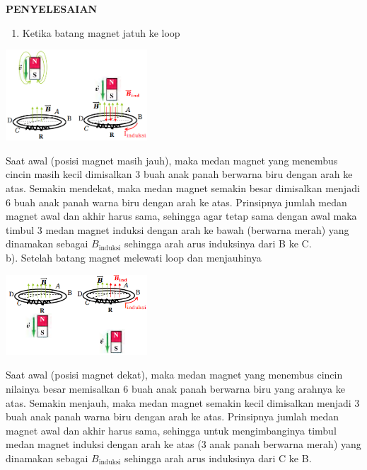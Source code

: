 \documentclass[twocolumn, 11pt]{article}%
\begin{document}
\textbf{PENYELESAIAN} 

\begin{enumerate}[label=\alph*).]
    \item Ketika batang magnet jatuh ke loop
\end{enumerate}

\begin{center}
    \includegraphics[width=200px]{11.png}
\end{center}

Saat awal (posisi magnet masih jauh), maka medan magnet yang menembus
cincin masih kecil dimisalkan 3 buah anak panah berwarna biru dengan arah
ke atas. Semakin mendekat, maka medan magnet semakin besar dimisalkan
menjadi 6 buah anak panah warna biru dengan arah ke atas.
Prinsipnya jumlah medan magnet awal dan akhir harus sama, sehingga agar
tetap sama dengan awal maka timbul 3 medan magnet induksi dengan arah ke
bawah (berwarna merah) yang dinamakan sebagai $B_{\text{induksi}}$
sehingga arah arus induksinya dari B ke C.\\


b). Setelah batang magnet melewati loop dan menjauhinya

\begin{center}
    \includegraphics[width=200px]{12.png}
\end{center}

Saat awal (posisi magnet dekat), maka medan magnet yang menembus cincin
nilainya besar memisalkan 6 buah anak panah berwarna biru yang arahnya ke
atas. Semakin menjauh, maka medan magnet semakin kecil dimisalkan menjadi 3
buah anak panah warna biru dengan arah ke atas. Prinsipnya jumlah medan
magnet awal dan akhir harus sama, sehingga untuk mengimbanginya  timbul
medan magnet induksi dengan arah ke atas (3 anak panah berwarna merah) yang
dinamakan sebagai $B_{\text{induksi}}$ sehingga arah arus induksinya
dari C ke B.
\end{document}
